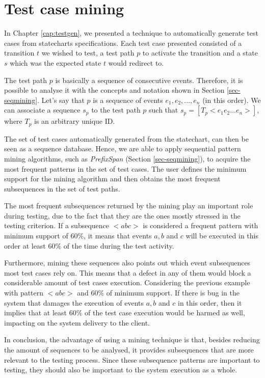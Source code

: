 \section{Test case mining}
\label{sec-testsequence}

In Chapter \ref{cap:testgen}, we presented a technique to automatically generate test cases from statecharts specifications. Each test case presented consisted of a transition $t$ we wished to test, a test path $p$ to activate the transition and a state $s$ which was the expected state $t$ would redirect to.

The test path $p$ is basically a sequence of consecutive events. Therefore, it is possible to analyse it with the concepts and notation shown in Section \ref{sec-seqmining}. Let's say that $p$ is a sequence of events $e_1,e_2,...,e_n$ (in this order). We can associate a sequence $s_p$ to the test path $p$ such that $s_p = [T_p < e_1e_2...e_n >]$, where $T_p$ is an arbitrary unique ID.


The set of test cases automatically generated from the statechart, can then be seen as a sequence database. Hence, we are able to apply sequential pattern mining algorithms, such as \textit{PrefixSpan} (Section \ref{sec-seqmining}), to acquire the most frequent patterns in the set of test cases. The user defines the minimum support for the mining algorithm and then obtains the most frequent subsequences in the set of test paths.

The most frequent subsequences returned by the mining play an important role during testing, due to the fact that they are the ones mostly stressed in the testing criterion. If a subsequence $< a b c >$ is considered a frequent pattern with minimum support of $60\%$, it means that events $a, b$ and $c$ will be executed in this order at least $60\%$ of the time during the test activity.

Furthermore, mining these sequences also points out which event subsequences most test cases rely on. This means that a defect in any of them would block a considerable amount of test cases execution. Considering the previous example with pattern $< a b c >$ and $60\%$ of minimum support. If there is bug in the system that damages the execution of events $a, b$ and $c$ in this order, then it implies that at least $60\%$ of the test case execution would be harmed as well, impacting on the system delivery to the client.

In conclusion, the advantage of using a mining technique is that, besides reducing the amount of sequences to be analysed, it provides subsequences that are more relevant to the testing process. Since these subsequence patterns are important to testing, they should also be important to the system execution as a whole. 




